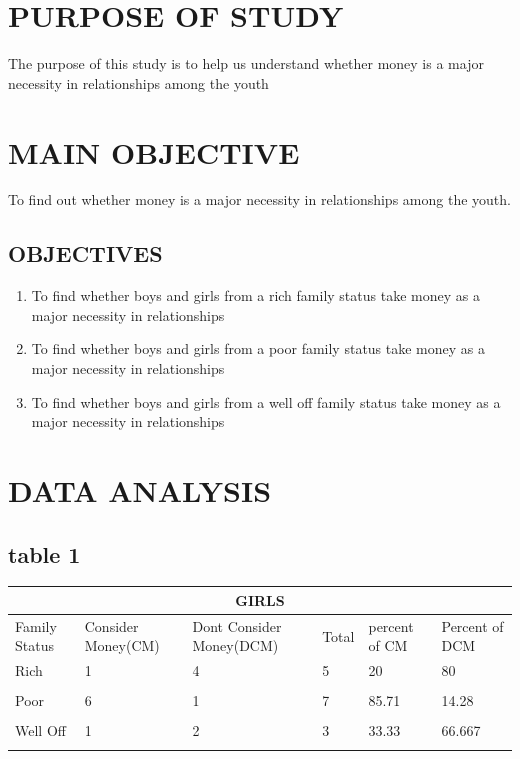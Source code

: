 \documentclass[12pt,letterpaper]{article}
\begin{document}
{		\section{PURPOSE OF STUDY}
		The purpose of this study is to help us understand whether money is a major necessity in relationships among the youth
		\section{MAIN OBJECTIVE}
		To find out whether money is a major necessity in relationships among the youth.
		\subsection{OBJECTIVES}
		\begin{enumerate}
			
			\item To find whether boys and girls from a rich family status take money as a major necessity in relationships\\
			\item To find whether boys and girls from a poor family status take money as a major necessity in relationships\\
			\item To find whether boys and girls from a well off family status take money as a major necessity in relationships\\
			
		\end{enumerate}
		
		
		\section{DATA ANALYSIS}
		\subsection{table 1}
		
		
		
		\begin{tabular}{ |p{1cm}||p{2cm}|p{2cm}|p{1cm}|p{2cm}|p{1cm}  }
			\hline
			\multicolumn{6}{|c|}{GIRLS} \\
			\hline
			Family Status & Consider Money(CM)&Dont Consider Money(DCM) &Total& percent of CM& Percent of DCM\\
			\hline
			Rich   & 1    &4&  5&20&80\\\\
			Poor&6&1&7&85.71&14.28\\\\
			Well Off &1&2&3&33.33&66.667\\\\
			\hline
		\end{tabular}
		
}
\end{document}
